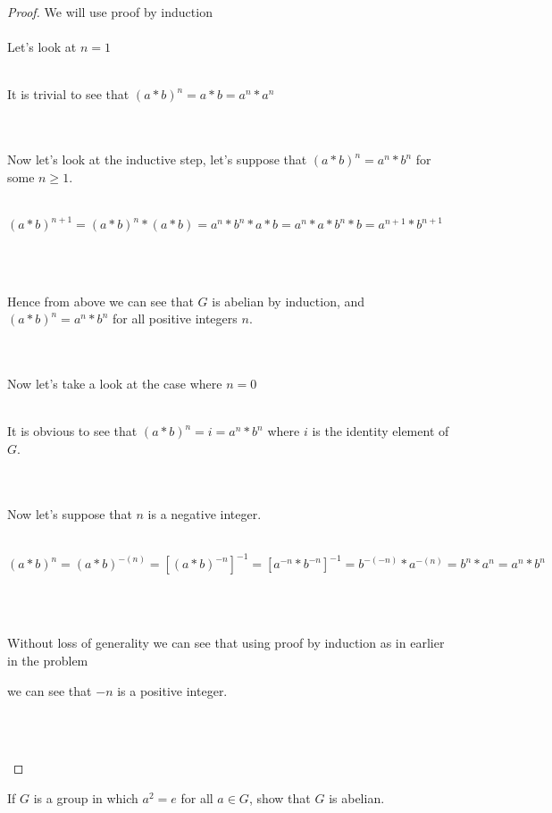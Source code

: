 \documentclass[12pt]{article}
\newenvironment{problem}[2][Problem]{\begin{trivlist}
\item[\hskip \labelsep {\bfseries #1}\hskip \labelsep {\bfseries #2.}]}{\end{trivlist}}
\begin{document}
\begin{proof}
We will use proof by induction \\ \\
Let's look at $n=1$ \\ \\
\centerline{It is trivial to see that $(a*b)^n=a*b=a^n*a^n$} \\ \\
Now let's look at the inductive step, let's suppose that $(a*b)^n=a^n*b^n$ for some $n \geq 1$. \\ \\
\centerline{$(a*b)^{n+1}=(a*b)^n*(a*b) = a^n*b^n*a*b = a^n*a*b^n*b=a^{n+1}*b^{n+1}$} \\ \\
\centerline{Hence from above we can see that $G$ is abelian by induction, and $(a*b)^n=a^n*b^n$ for all positive integers $n$.} \\ \\
Now let's take a look at the case where $n=0$ \\ \\
\centerline{It is obvious to see that $(a*b)^n=i=a^n*b^n$ where $i$ is the identity element of $G$.} \\ \\
Now let's suppose that $n$ is a negative integer. \\ \\
\centerline{$(a*b)^{n}=(a*b)^{-(n)} = [(a*b)^{-n}]^{-1} = [a^{-n}*b^{-n}]^{-1}=b^{-(-n)}*a^{-(n)}=b^n*a^n=a^n*b^n$} \\ \\
\centerline{Without loss of generality we can see that using proof by induction as in earlier in the problem }
\centerline{we can see that $-n$ is a positive integer.} \\ \\
\centerline{}
\end{proof}

\begin{problem}{2.1.9}
If $G$ is a group in which $a^2 =e$ for all $a \in G$, show that $G$ is abelian.
\end{problem}
\end{document}
